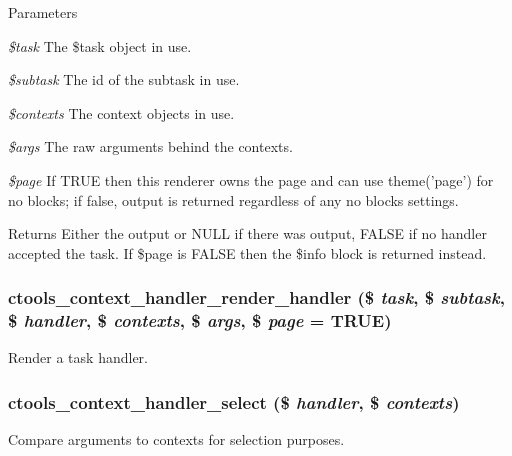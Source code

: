\begin{DoxyParams}{Parameters}
\item[{\em \$task}]The \$task object in use. \item[{\em \$subtask}]The id of the subtask in use. \item[{\em \$contexts}]The context objects in use. \item[{\em \$args}]The raw arguments behind the contexts. \item[{\em \$page}]If TRUE then this renderer owns the page and can use theme('page') for no blocks; if false, output is returned regardless of any no blocks settings. \end{DoxyParams}
\begin{DoxyReturn}{Returns}
Either the output or NULL if there was output, FALSE if no handler accepted the task. If \$page is FALSE then the \$info block is returned instead. 
\end{DoxyReturn}
\hypertarget{context-task-handler_8inc_a75643365ecd521559adca3889dd5ce64}{
\subsubsection[{ctools\_\-context\_\-handler\_\-render\_\-handler}]{\setlength{\rightskip}{0pt plus 5cm}ctools\_\-context\_\-handler\_\-render\_\-handler (\$ {\em task}, \/  \$ {\em subtask}, \/  \$ {\em handler}, \/  \$ {\em contexts}, \/  \$ {\em args}, \/  \$ {\em page} = {\ttfamily TRUE})}}
\label{context-task-handler_8inc_a75643365ecd521559adca3889dd5ce64}
Render a task handler. \hypertarget{context-task-handler_8inc_a8fe40e14c624ef707817204ece36295d}{
\subsubsection[{ctools\_\-context\_\-handler\_\-select}]{\setlength{\rightskip}{0pt plus 5cm}ctools\_\-context\_\-handler\_\-select (\$ {\em handler}, \/  \$ {\em contexts})}}
\label{context-task-handler_8inc_a8fe40e14c624ef707817204ece36295d}
Compare arguments to contexts for selection purposes.


